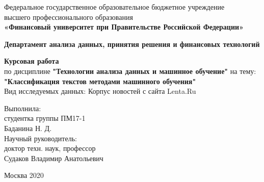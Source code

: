 \documentclass{article}
\begin{document}
                                                         
\newpage
\thispagestyle{empty}

\begin{center}
Федеральное государственное образовательное бюджетное учреждение\\ высшего профессионального образования\\ 
\textbf{«Финансовый университет при Правительстве Российской Федерации»}\\
\end{center}
	
\vspace{2em}
	
\begin{center}
\textbf{Департамент анализа данных, принятия решения и финансовых технологий}\\ 
\end{center}
	
\vspace{2em}
	
\begin{center}
\textbf{Курсовая работа\\
\vspace{3mm}}
по дисциплине \textbf{"Технологии анализа данных и машинное обучение"} на тему: \\ \vspace{2em} \textbf{"Классификация текстов методами машинного обучения"}\\
\vspace{3mm}
Вид исследуемых данных: Корпус новостей с сайта Lenta.Ru\\
\end{center}
	
\vspace{6em}
		
\begin{flushright}
Выполнила:\\
студентка группы ПМ17-1\\
Баданина Н. Д.\\
Научный руководитель:\\
доктор техн. наук, профессор\\
Судаков Владимир Анатольевич
\end{flushright}
	
\vspace{\fill}
	
\begin{center}
Москва 2020
\end{center}

\newpage
	
\end{document}
